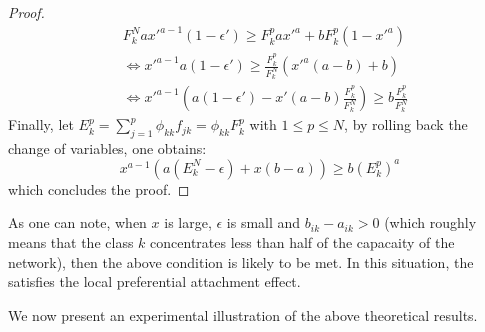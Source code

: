 \begin{proof}
\begin{align*}
&F_k^N a x'^{a-1} (1-\epsilon') \geq F_k^p a x'^a + b F_k^p (1-x'^a) \\
&\Leftrightarrow x'^{a-1} a(1-\epsilon') \geq \frac{F_k^p}{F_k^N} ( x'^a(a-b) + b) \\
&\Leftrightarrow x'^{a-1} \left(a(1-\epsilon') - x'(a-b)\frac{F_k^p}{F_k^N} \right) \geq b \frac{F_k^p}{F_k^N}
\end{align*}
Finally, let $E_k^p=\sum_{j=1}^p \phi_{kk}f_{jk}=\phi_{kk}F_k^p$  with $1\leq p \leq N$, by rolling back the change of variables, one obtains:
\begin{equation*}
x^{a-1}\left(a(E_k^N-\epsilon) +x(b-a) \right) \geq b (E_k^p)^a
\end{equation*}
which concludes the proof.
\end{proof}



As one can note, when $x$ is large, $\epsilon$ is small and $b_{ik}-a_{ik}>0$ (which roughly means that the class $k$ concentrates less than half of the capacaity of the network), then the above condition is likely to be met. In this situation, the \imb satisfies the local preferential attachment effect.

We now present an experimental illustration of the above theoretical results.



